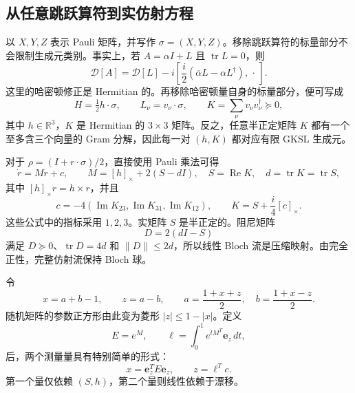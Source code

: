 \documentclass[UTF8,11pt,a4paper,fontset=fandol]{ctexart}
\theoremstyle{definition}
\theoremstyle{remark}
\DeclareMathOperator{\tr}{tr}
\DeclareMathOperator{\Rea}{Re}
\DeclareMathOperator{\Ima}{Im}
\newcommand{\Diss}{\mathcal D}
\newcommand{\ee}{\mathbf e_z}
\newcommand{\R}{\mathbb R}
\newcommand{\PSD}{\succeq0}
\begin{document}
\subsection{从任意跳跃算符到实仿射方程}
以 \(X,Y,Z\) 表示 Pauli 矩阵，并写作 \(\sigma=(X,Y,Z)\)。移除跳跃算符的标量部分不会限制生成元类别。事实上，若 \(A=\alpha I+L\) 且 \(\tr L=0\)，则
\begin{equation}\label{eq:scalar-gauge}
 \Diss[A]=\Diss[L]-i\left[\frac{i}{2}(\overline\alpha L-\alpha L^\dagger),\,\cdot\,\right].
\end{equation}
这里的哈密顿修正是 Hermitian 的。再移除哈密顿量自身的标量部分，便可写成
\begin{equation}\label{eq:canonical}
 H=\tfrac12 h\cdot\sigma,\qquad L_\nu=v_\nu\cdot\sigma,
 \qquad K=\sum_\nu v_\nu v_\nu^\dagger\PSD,
\end{equation}
其中 \(h\in\R^3\)，\(K\) 是 Hermitian 的 \(3\times3\) 矩阵。反之，任意半正定矩阵 \(K\) 都有一个至多含三个向量的 Gram 分解，因此每一对 \((h,K)\) 都对应有限 GKSL 生成元。

对于 \(\rho=(I+r\cdot\sigma)/2\)，直接使用 Pauli 乘法可得
\begin{equation}\label{eq:bloch}
 \dot r=Mr+c,\qquad
 M=[h]_\times+2(S-dI),\quad S=\Rea K,\quad d=\tr K=\tr S,
\end{equation}
其中 \([h]_\times r=h\times r\)，并且
\begin{equation}\label{eq:drift}
 c=-4(\Ima K_{23},\Ima K_{31},\Ima K_{12}),\qquad
 K=S+\frac{i}{4}[c]_\times.
\end{equation}
这些公式中的指标采用 \(1,2,3\)。实矩阵 \(S\) 是半正定的。阻尼矩阵
\begin{equation}\label{eq:damping}
 D=2(dI-S)
\end{equation}
满足 \(D\PSD\)、\(\tr D=4d\) 和 \(\|D\|\leq2d\)，所以线性 Bloch 流是压缩映射。由完全正性，完整仿射流保持 Bloch 球。

令
\begin{equation}\label{eq:xz}
 x=a+b-1,\qquad z=a-b,
 \qquad a=\frac{1+x+z}{2},\quad b=\frac{1+x-z}{2}.
\end{equation}
随机矩阵的参数正方形由此变为菱形 \(|z|\leq1-|x|\)。定义
\begin{equation}\label{eq:linear-readout}
 E=e^M,\qquad \ell=\int_0^1e^{tM^T}\ee\,dt,
\end{equation}
后，两个测量量具有特别简单的形式：
\begin{equation}\label{eq:xz-readout}
 x=\ee^T E\ee,\qquad z=\ell^Tc.
\end{equation}
第一个量仅依赖 \((S,h)\)，第二个量则线性依赖于漂移。
\end{document}

